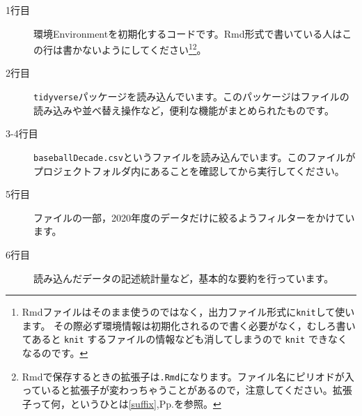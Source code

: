 \begin{description}
	\item[1行目] 環境Environmentを初期化するコードです。Rmd形式で書いている人はこの行は書かないようにしてください\footnote{Rmdファイルはそのまま使うのではなく，出力ファイル形式に\verb|knit|して使います。 その際必ず環境情報は初期化されるので書く必要がなく，むしろ書いてあると \verb|knit| するファイルの情報なども消してしまうので \verb|knit| できなくなるのです。}\footnote{Rmdで保存するときの拡張子は\verb|.Rmd|になります。ファイル名にピリオドが入っていると拡張子が変わっちゃうことがあるので，注意してください。拡張子って何，というひとは\ref{suffix},Pp.\pageref{suffix}を参照。}。
	\item[2行目] \texttt{tidyverse}パッケージを読み込んでいます。このパッケージはファイルの読み込みや並べ替え操作など，便利な機能がまとめられたものです。
	\item[3-4行目] \texttt{baseballDecade.csv}というファイルを読み込んでいます。このファイルがプロジェクトフォルダ内にあることを確認してから実行してください。
	\item[5行目] ファイルの一部，2020年度のデータだけに絞るようフィルターをかけています。
	\item[6行目] 読み込んだデータの記述統計量など，基本的な要約を行っています。
\end{description}
